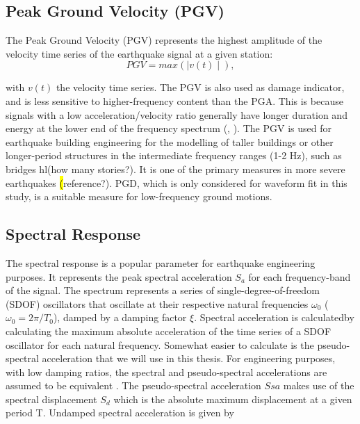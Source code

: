 \documentclass[../Text/00main.tex]{subfiles}
\begin{document}
\subsection{Peak Ground Velocity (PGV)}

The Peak Ground Velocity (PGV) represents the highest amplitude of the velocity time series of the earthquake signal at a given station:
\begin{equation}
    PGV = max(\mid v(t) \mid),
\end{equation}

with $v(t)$ the velocity time series. The PGV is also used as damage indicator, and is less sensitive to higher-frequency content than the PGA. This is because signals with a low acceleration/velocity ratio generally have longer duration and energy at the lower end of the frequency spectrum (\citet{tso1992engineering}, \citet{kramer:1996}). The PGV is used for earthquake building engineering for the modelling of taller buildings or other longer-period structures in the intermediate frequency ranges (1-2 Hz), such as bridges hl{(how many stories?)}. It is one of the primary measures in more severe earthquakes \hl(reference?). PGD, which is only considered for waveform fit in this study, is a suitable measure for low-frequency ground motions.

\subsection{Spectral Response}

The spectral response is a popular parameter for earthquake engineering purposes. It represents the peak spectral acceleration $S_a$ for each frequency-band of the signal. The spectrum represents a series of single-degree-of-freedom (SDOF) oscillators that oscillate at their respective natural frequencies $\omega_0$ ($\omega_0 = 2\pi/T_0$), damped by a damping factor $\xi$. Spectral acceleration is calculatedby calculating the maximum absolute acceleration of the time series of a SDOF oscillator for each natural frequency. Somewhat easier to calculate is the pseudo-spectral acceleration that we will use in this thesis. For engineering purposes, with low damping ratios, the spectral and pseudo-spectral accelerations are assumed to be equivalent \citep{newmark1974fundamentals}. The pseudo-spectral acceleration $Ssa$ makes use of the spectral displacement $S_d$ which is the absolute maximum displacement at a given period T. Undamped spectral acceleration is given by
\end{document}
